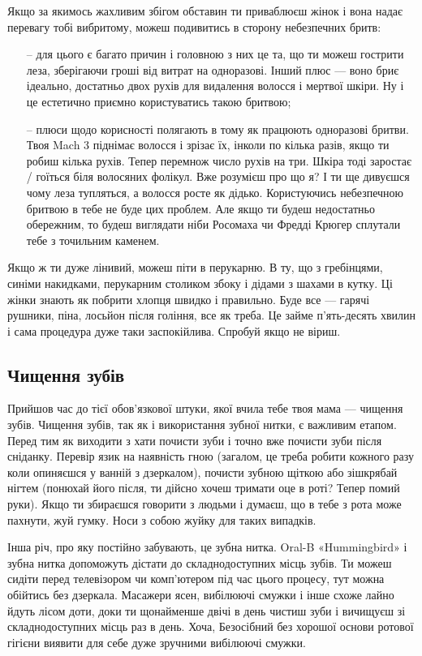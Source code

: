 Якщо за якимось жахливим збігом обставин ти приваблюєш жінок і вона надає
перевагу тобі вибритому, можеш подивитись в сторону небезпечних бритв:
\begin{itemize}
	\item[--] для цього є багато причин і головною з них це та, що ти можеш
	гострити леза, зберігаючи гроші від витрат на одноразові. Інший плюс —
	воно бриє ідеально, достатньо двох рухів для видалення волосся і мертвої
	шкіри. Ну і це естетично приємно користуватись такою бритвою;
	\item[--] плюси щодо корисності полягають в тому як працюють одноразові
	бритви. Твоя Mach 3 піднімає волосся і зрізає їх, інколи по кілька разів,
	якщо ти робиш кілька рухів. Тепер перемнож число рухів на три. Шкіра тоді
	заростає / гоїться біля волосяних фолікул. Вже розумієш про що я? І ти ще
	дивуєшся чому леза тупляться, а волосся росте як дідько. Користуючись
	небезпечною бритвою в тебе не буде цих проблем. Але якщо ти будеш
	недостатньо обережним, то будеш виглядати ніби Росомаха чи Фредді Крюгер
	сплутали тебе з точильним каменем.
\end{itemize}

Якщо ж ти дуже лінивий, можеш піти в перукарню. В ту, що з гребінцями, синіми
накидками, перукарним столиком збоку і дідами з шахами в кутку. Ці жінки знають
як побрити хлопця швидко і правильно. Буде все — гарячі рушники, піна, лосьйон
після гоління, все як треба. Це займе п’ять-десять хвилин і сама процедура
дуже таки заспокійлива. Спробуй якщо не віриш.

\subsection{Чищення зубів}
Прийшов час до тієї обов’язкової штуки, якої вчила тебе твоя мама — чищення
зубів. Чищення зубів, так як і використання зубної нитки, є важливим етапом.
Перед тим як виходити з хати почисти зуби і точно вже почисти зуби після
сніданку. Перевір язик на наявність гною (загалом, це треба робити кожного
разу коли опиняєшся у ванній з дзеркалом), почисти зубною щіткою або зішкрябай
нігтем (понюхай його після, ти дійсно хочеш тримати оце в роті? Тепер помий
руки). Якщо ти збираєшся говорити з людьми і думаєш, що в тебе з рота може
пахнути, жуй гумку. Носи з собою жуйку для таких випадків.

Інша річ, про яку постійно забувають, це зубна нитка. Oral-B «Hummingbird» і
зубна нитка допоможуть дістати до складнодоступних місць зубів. Ти можеш сидіти
перед телевізором чи комп’ютером під час цього процесу, тут можна обійтись
без дзеркала. Масажери ясен, вибілюючі смужки і інше схоже лайно йдуть лісом
доти, доки ти щонайменше двічі в день чистиш зуби і вичищуєш зі
складнодоступних місць раз в день. Хоча, Безосібний без хорошої основи
ротової гігієни виявити для себе дуже зручними вибілюючі смужки.


